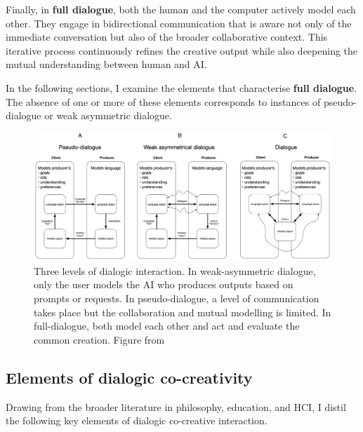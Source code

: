 Finally, in \textbf{full dialogue}, both the human and the computer actively model each other. They engage in bidirectional communication that is aware not only of the immediate conversation but also of the broader collaborative context. This iterative process continuously refines the creative output while also deepening the mutual understanding between human and AI. 

In the following sections, I examine the elements that characterise \textbf{full dialogue}. The absence of one or more of these elements corresponds to instances of pseudo-dialogue or weak asymmetric dialogue.

\begin{figure}
    \centering
    \includegraphics[width=1\linewidth]{levels of dialogue.png}
    \caption{Three levels of dialogic interaction. In weak-asymmetric dialogue, only the user models the AI who produces outputs based on prompts or requests. In pseudo-dialogue, a level of communication takes place but the collaboration and mutual modelling is limited. In full-dialogue, both model each other and act and evaluate the common creation.  Figure from \cite{Bown2024-yx}}
    \label{fig:enter-label}
\end{figure}
\subsection{Elements of dialogic co-creativity}

Drawing from the broader literature in philosophy, education, and HCI, I distil the following key elements of dialogic co-creative interaction. 


